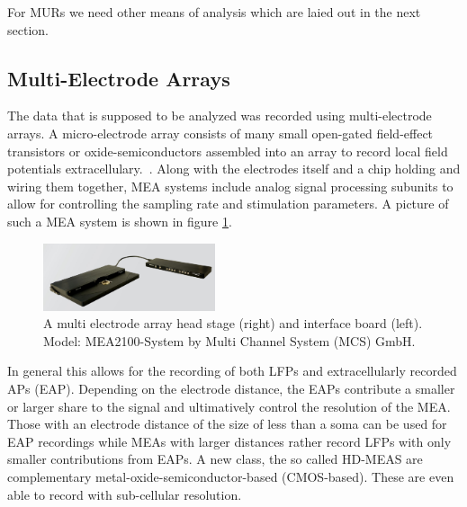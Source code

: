 \documentclass[11pt, twocolumn]{article}
\begin{document}
        For MURs we need other means of analysis which are laied out in the next section.

    \subsection{Multi-Electrode Arrays}
        The data that is supposed to be analyzed was recorded using multi-electrode arrays.
        A micro-electrode array consists of many small open-gated field-effect transistors or oxide-semiconductors assembled into an array to record local field potentials extracellulary.~\autocite{10.3389/fnins.2014.00423}.
        Along with the electrodes itself and a chip holding and wiring them together, MEA systems include analog signal processing subunits to allow for controlling the sampling rate and stimulation parameters.
        A picture of such a MEA system is shown in figure \ref{mea}.
        \begin{figure}
         \begin{center}
          \includegraphics[keepaspectratio, width=0.45\textwidth]{img/1_setup_mea.png}
         \end{center}
         \caption{A multi electrode array head stage (right) and interface board (left). Model: MEA2100-System by Multi Channel System (MCS) GmbH.}\label{mea}
        \end{figure}

        In general this allows for the recording of both LFPs and extracellularly recorded APs (EAP).
        Depending on the electrode distance, the EAPs contribute a smaller or larger share to the signal and ultimatively control the resolution of the MEA.
        Those with an electrode distance of the size of less than a soma can be used for EAP recordings while MEAs with larger distances rather record LFPs with only smaller contributions from EAPs.
        A new class, the so called HD-MEAS are complementary metal-oxide-semiconductor-based (CMOS-based).
        These are even able to record with sub-cellular resolution.
\end{document}
